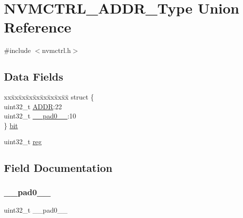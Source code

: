 \hypertarget{union_n_v_m_c_t_r_l___a_d_d_r___type}{}\section{N\+V\+M\+C\+T\+R\+L\+\_\+\+A\+D\+D\+R\+\_\+\+Type Union Reference}
\label{union_n_v_m_c_t_r_l___a_d_d_r___type}


{\ttfamily \#include $<$nvmctrl.\+h$>$}

\subsection*{Data Fields}
\begin{DoxyCompactItemize}
\item 
\begin{tabbing}
xx\=xx\=xx\=xx\=xx\=xx\=xx\=xx\=xx\=\kill
struct \{\\
\>uint32\_t \mbox{\hyperlink{union_n_v_m_c_t_r_l___a_d_d_r___type_ac9f49eaa00ec245d66e5342c02bcce9f}{ADDR}}:22\\
\>uint32\_t \mbox{\hyperlink{union_n_v_m_c_t_r_l___a_d_d_r___type_a3e57c2ef1c3ffb36722f000cc1156824}{\_\_pad0\_\_}}:10\\
\} \mbox{\hyperlink{union_n_v_m_c_t_r_l___a_d_d_r___type_a56b8b654a7eafc78561f7127a140b7b0}{bit}}\\

\end{tabbing}\item 
uint32\+\_\+t \mbox{\hyperlink{union_n_v_m_c_t_r_l___a_d_d_r___type_a6b91636401516a477989a336376d7b40}{reg}}
\end{DoxyCompactItemize}


\subsection{Field Documentation}
\mbox{\label{union_n_v_m_c_t_r_l___a_d_d_r___type_a3e57c2ef1c3ffb36722f000cc1156824}} 
\subsubsection{\texorpdfstring{\_\_pad0\_\_}{\_\_pad0\_\_}}
{\footnotesize\ttfamily uint32\+\_\+t \+\_\+\+\_\+pad0\+\_\+\+\_\+}

